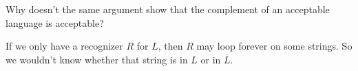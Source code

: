 \documentclass[12pt,answers]{exam}
\begin{document}
\begin{questions}
\vfill

\question Why doesn't the same argument show that the complement of an acceptable language is acceptable?  
\begin{solution}
If we only have a recognizer $R$ for $L$, then $R$ may loop forever on some strings.  So we wouldn't know whether that string is in $L$ or in $\overline{L}$. 
\end{solution}
\vfill

%

\end{questions}
\end{document}
